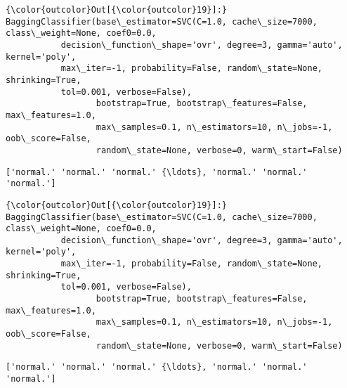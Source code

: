 \documentclass[11pt]{article}
\begin{document}
\begin{Verbatim}[commandchars=\\\{\}]
{\color{outcolor}Out[{\color{outcolor}19}]:} BaggingClassifier(base\_estimator=SVC(C=1.0, cache\_size=7000, class\_weight=None, coef0=0.0,
           decision\_function\_shape='ovr', degree=3, gamma='auto', kernel='poly',
           max\_iter=-1, probability=False, random\_state=None, shrinking=True,
           tol=0.001, verbose=False),
                  bootstrap=True, bootstrap\_features=False, max\_features=1.0,
                  max\_samples=0.1, n\_estimators=10, n\_jobs=-1, oob\_score=False,
                  random\_state=None, verbose=0, warm\_start=False)
\end{Verbatim}
            
    \begin{Verbatim}[commandchars=\\\{\}]
['normal.' 'normal.' 'normal.' {\ldots}, 'normal.' 'normal.' 'normal.']

    \end{Verbatim}

\begin{Verbatim}[commandchars=\\\{\}]
{\color{outcolor}Out[{\color{outcolor}19}]:} BaggingClassifier(base\_estimator=SVC(C=1.0, cache\_size=7000, class\_weight=None, coef0=0.0,
           decision\_function\_shape='ovr', degree=3, gamma='auto', kernel='poly',
           max\_iter=-1, probability=False, random\_state=None, shrinking=True,
           tol=0.001, verbose=False),
                  bootstrap=True, bootstrap\_features=False, max\_features=1.0,
                  max\_samples=0.1, n\_estimators=10, n\_jobs=-1, oob\_score=False,
                  random\_state=None, verbose=0, warm\_start=False)
\end{Verbatim}
            
    \begin{Verbatim}[commandchars=\\\{\}]
['normal.' 'normal.' 'normal.' {\ldots}, 'normal.' 'normal.' 'normal.']

    \end{Verbatim}
\end{document}
